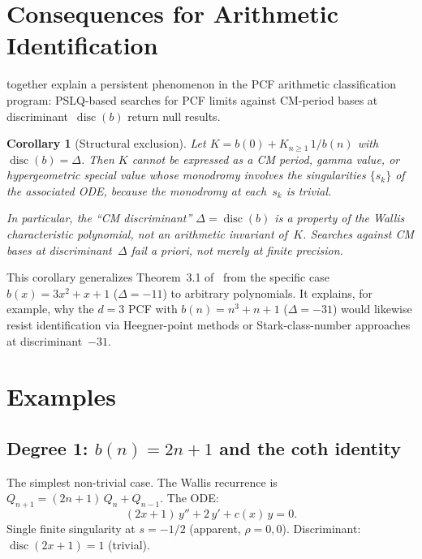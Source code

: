 \documentclass[11pt,a4paper]{amsart}
\theoremstyle{plain}
\newtheorem{corollary}[theorem]{Corollary}
\theoremstyle{definition}
\theoremstyle{remark}
\newcommand{\disc}{\operatorname{disc}}
\begin{document}
\section{Consequences for Arithmetic Identification}
\label{sec:arithmetic}

 together explain a persistent
phenomenon in the PCF arithmetic classification program:
PSLQ-based searches for PCF limits against CM-period bases at
discriminant~$\disc(b)$ return null results.

\begin{corollary}[Structural exclusion]\label{cor:exclusion}
Let $K = b(0) + K_{n\ge 1}\,1/b(n)$ with $\disc(b) = \Delta$.
Then $K$ cannot be expressed as a CM period, gamma value, or
hypergeometric special value whose monodromy involves the
singularities $\{s_k\}$ of the associated ODE, because the
monodromy at each~$s_k$ is trivial.

In particular, the ``CM discriminant'' $\Delta = \disc(b)$ is a
property of the Wallis characteristic polynomial, not an arithmetic
invariant of~$K$.  Searches against CM bases at discriminant~$\Delta$
fail \emph{a priori}, not merely at finite precision.
\end{corollary}

This corollary generalizes Theorem~3.1 of~\cite{Vquad} from the
specific case $b(x) = 3x^2+x+1$ ($\Delta = -11$) to arbitrary
polynomials.  It explains, for example, why the $d=3$ PCF with
$b(n) = n^3+n+1$ ($\Delta = -31$) would likewise resist
identification via Heegner-point methods or Stark-class-number
approaches at discriminant~$-31$.

\section{Examples}\label{sec:examples}

\subsection{Degree 1: \texorpdfstring{$b(n) = 2n+1$}{b(n)=2n+1}
  and the coth identity}
\label{sec:ex-coth}

The simplest non-trivial case.  The Wallis recurrence is
$Q_{n+1} = (2n+1)\,Q_n + Q_{n-1}$.  The ODE:
\[
  (2x+1)\,y'' + 2\,y' + c(x)\,y = 0.
\]
Single finite singularity at $s = -1/2$ (apparent, $\rho = 0,0$).
Discriminant: $\disc(2x+1) = 1$ (trivial).
\end{document}

